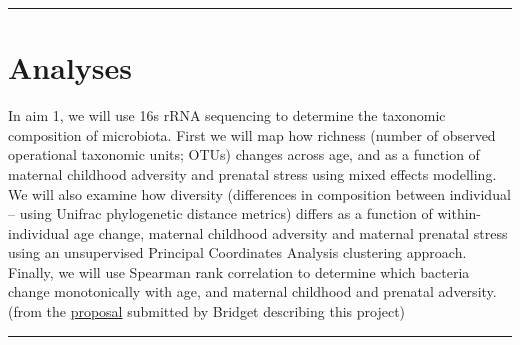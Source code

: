 \documentclass[
]{book}
\begin{document}
\begin{center}\rule{0.5\linewidth}{0.5pt}\end{center}

\hypertarget{analyses}{%
\section{Analyses}\label{analyses}}

In aim 1, we will use 16s rRNA sequencing to determine the taxonomic composition of microbiota. First we will map how richness (number of observed operational taxonomic units; OTUs) changes across age, and as a function of maternal childhood adversity and prenatal stress using mixed effects modelling. We will also examine how diversity (differences in composition between individual -- using Unifrac phylogenetic distance metrics) differs as a function of within-individual age change, maternal childhood adversity and maternal prenatal stress using an unsupervised Principal Coordinates Analysis clustering approach. Finally, we will use Spearman rank correlation to determine which bacteria change monotonically with age, and maternal childhood and prenatal adversity. (from the \href{https://ucla.app.box.com/file/740587024475}{proposal} submitted by Bridget describing this project)

\begin{center}\rule{0.5\linewidth}{0.5pt}\end{center}

  
\end{document}
